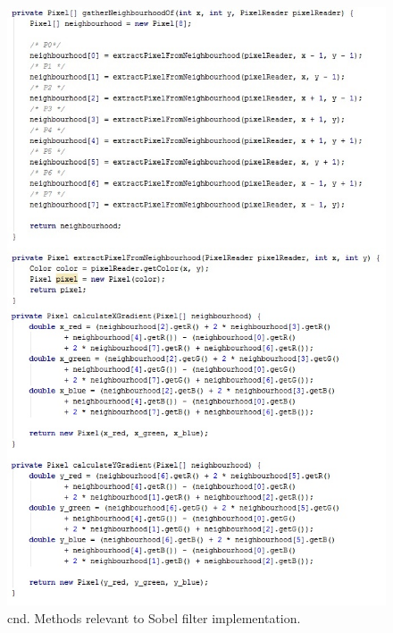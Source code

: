 \documentclass{article}
\begin{document}
\begin{figure}[H]
	\centering
	\includegraphics[width=\textwidth]{_Figures/code/sobel_2.jpg}
    \caption{cnd. Methods relevant to Sobel filter implementation.}
    \label{fig:code:dobel_2}
\end{figure}

\newpage

%
%
\end{document}
